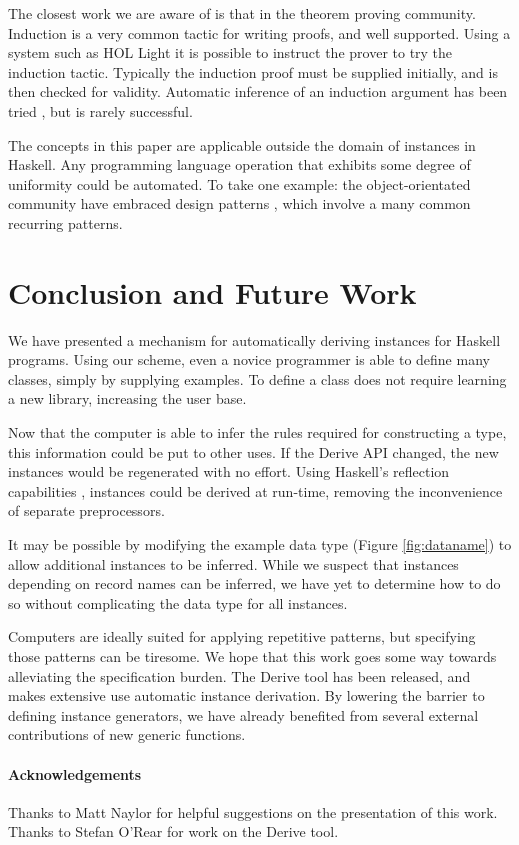 \documentclass{llncs}
\begin{document}
The closest work we are aware of is that in the theorem proving community. Induction is a very common tactic for writing proofs, and well supported. Using a system such as HOL Light \cite{hol_light} it is possible to instruct the prover to try the induction tactic. Typically the induction proof must be supplied initially, and is then checked for validity. Automatic inference of an induction argument has been tried \cite{mintchev:reasoning}, but is rarely successful.

The concepts in this paper are applicable outside the domain of instances in Haskell. Any programming language operation that exhibits some degree of uniformity could be automated. To take one example: the object-orientated community have embraced design patterns \cite{design_patterns}, which involve a many common recurring patterns.

\section{Conclusion and Future Work}
\label{sec:conclusion}

We have presented a mechanism for automatically deriving instances for Haskell programs. Using our scheme, even a novice programmer is able to define many classes, simply by supplying examples. To define a class does not require learning a new library, increasing the user base.

Now that the computer is able to infer the rules required for constructing a type, this information could be put to other uses. If the Derive API changed, the new instances would be regenerated with no effort. Using Haskell's reflection capabilities \cite{lammel:syb2}, instances could be derived at run-time, removing the inconvenience of separate preprocessors.

It may be possible by modifying the example data type (Figure \ref{fig:dataname}) to allow additional instances to be inferred. While we suspect that instances depending on record names can be inferred, we have yet to determine how to do so without complicating the data type for all instances.

Computers are ideally suited for applying repetitive patterns, but specifying those patterns can be tiresome. We hope that this work goes some way towards alleviating the specification burden. The Derive tool has been released, and makes extensive use automatic instance derivation. By lowering the barrier to defining instance generators, we have already benefited from several external contributions of new generic functions.

\paragraph{Acknowledgements}

Thanks to Matt Naylor for helpful suggestions on the presentation of this work. Thanks to Stefan O'Rear for work on the Derive tool.



\end{document}
